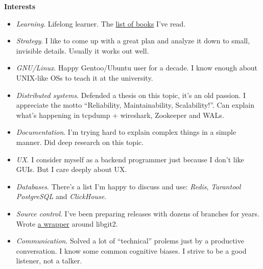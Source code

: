 \documentclass[final]{letter}
\begin{document}
{\bf Interests}
\begin{itemize}
  \item \textit{Learning}. Lifelong learner. The \href{https://www.goodreads.com/review/list/43338630-sergey-machulskis?shelf=professional}{list of books} I've read.
  \item \textit{Strategy}. I like to come up with a great plan and analyze it down to small, invisible details. Usually it works out well.
  \item \textit{GNU/Linux}. Happy Gentoo/Ubuntu user for a decade. I know enough about UNIX-like OSs to teach it at the university.
  \item \textit{Distributed systems}. Defended a thesis on this topic, it's an old passion. I appreciate the motto ``Reliability, Maintainability, Scalability!''.
     Can explain what's happening in tcpdump + wireshark, Zookeeper and WALs.
  \item \textit{Documentation}. I'm trying hard to explain complex things in a simple manner. Did deep research on this topic.
  \item \textit{UX}. I consider myself as a backend programmer just because I don't like GUIs. But I care deeply about UX.
  \item \textit{Databases}. There's a list I'm happy to discuss and use: \textit{Redis}, \textit{Tarantool} \textit{PostgreSQL} and \textit{ClickHouse}.
  \item \textit{Source control}. I've been preparing releases with dozens of branches for years.
     Wrote \href{https://github.com/neexee/review/tree/master/components/Git}{a wrapper} around libgit2.
  \item \textit{Communication}. Solved a lot of ``technical'' prolems just by a productive conversation.
    I know some common cognitive biases. I strive to be a good listener, not a talker.
\end{itemize}
\end{document}
